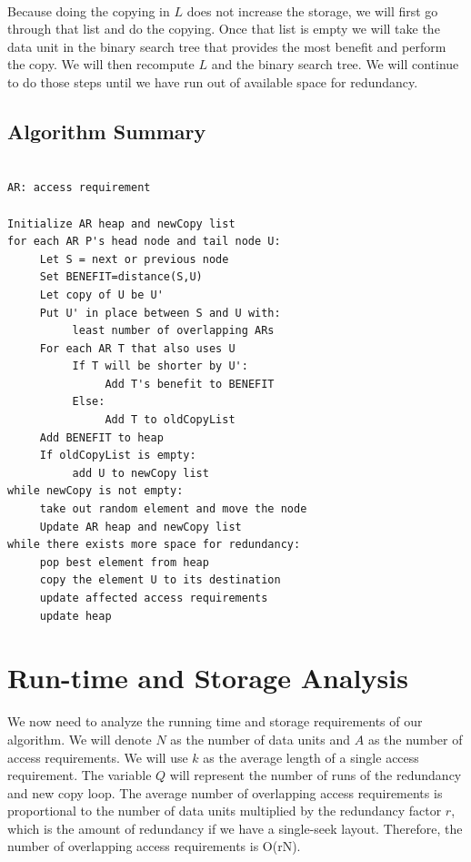 \documentclass[conference]{acmsiggraph}
\begin{document}
\\
Because doing the copying in $L$ does not increase the storage, we will first go through that list and do the copying. Once that list is empty we will take the data unit in the binary search tree that provides the most benefit and perform the copy. We will then recompute $L$ and the binary search tree. We will continue to do those steps until we have run out of available space for redundancy.  

\subsection{Algorithm Summary}

\begin{verbatim}

AR: access requirement

Initialize AR heap and newCopy list
for each AR P's head node and tail node U:
     Let S = next or previous node
     Set BENEFIT=distance(S,U)
     Let copy of U be U'
     Put U' in place between S and U with:
          least number of overlapping ARs
     For each AR T that also uses U
          If T will be shorter by U':
               Add T's benefit to BENEFIT
          Else:
               Add T to oldCopyList
     Add BENEFIT to heap
     If oldCopyList is empty:
          add U to newCopy list
while newCopy is not empty:
     take out random element and move the node
     Update AR heap and newCopy list
while there exists more space for redundancy:
     pop best element from heap
     copy the element U to its destination
     update affected access requirements
     update heap

\end{verbatim}

\section{Run-time and Storage Analysis}

We now need to analyze the running time and storage requirements of our algorithm. We will denote $N$ as the number of data units and $A$ as the number of access requirements. We will use $k$ as the average length of a single access requirement. The variable $Q$ will represent the number of runs of the redundancy and new copy loop. The average number of overlapping access requirements is proportional to the number of data units multiplied by the redundancy factor $r$, which is the amount of redundancy if we have a single-seek layout. Therefore, the number of overlapping access requirements is O(rN). 
\end{document}
